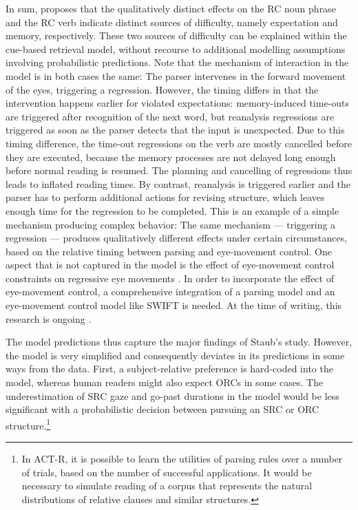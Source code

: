 \documentclass{cambridge7A}\usepackage[]{graphicx}\usepackage[]{color}
\begin{document}
In sum, \cite{Staub2010a} proposes that the qualitatively distinct effects on the RC noun phrase and the RC verb indicate distinct sources of difficulty, namely expectation and memory, respectively. These two sources of difficulty can be explained within the cue-based retrieval model, without recourse to additional modelling assumptions involving  probabilistic predictions. Note that the mechanism of interaction in the model is in both cases the same: The parser intervenes in the forward movement of the eyes, triggering a regression. However, the timing differs in that the intervention happens earlier for violated expectations: memory-induced time-outs are triggered after recognition of the next word, but reanalysis regressions are triggered as soon as the parser detects that the input is unexpected. Due to this timing difference, the time-out regressions on the verb are mostly cancelled before they are executed, because the memory processes are not delayed long enough before normal reading is resumed. The planning and cancelling of regressions thus leads to inflated reading times. By contrast, reanalysis is triggered earlier and the parser has to perform additional actions for revising structure, which leaves enough time for the regression to be completed. 
This is an example of a simple mechanism producing complex behavior: The same mechanism --- triggering a regression ---  produces qualitatively different effects under certain circumstances, based on the relative timing between parsing and eye-movement control. One aspect that is not captured in the model is the effect of eye-movement control constraints on regressive eye movements \citep{EngbertNuthmannRichter2005}. In order to incorporate the effect of eye-movement control, a comprehensive integration of a parsing model and an eye-movement control model like SWIFT is needed. At the time of writing, this research is ongoing \citep{Rabe2019}.

The model predictions thus capture the major findings of Staub's study. However, the model is very simplified and consequently deviates in its predictions in some ways from the data.
First, a subject-relative preference is hard-coded into the model, whereas human readers might also expect ORCs in some cases. The underestimation of SRC gaze and go-past durations in the model would be less significant with a probabilistic decision between pursuing an SRC or ORC structure.\footnote{In ACT-R, it is possible to learn the utilities of parsing rules over a number of trials, based on the number of successful applications. It would be necessary to simulate reading of a corpus that represents the natural distributions of relative clauses and similar structures.}
\end{document}
